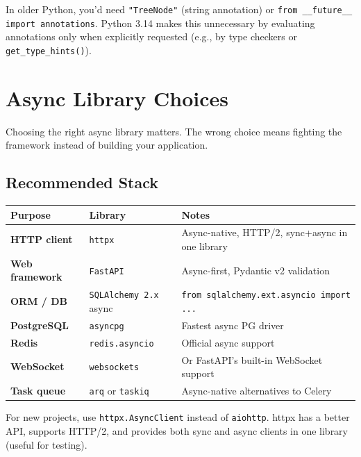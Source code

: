\documentclass[11pt,a4paper,oneside]{book}
\newcommand{\py}[1]{\texttt{\color{pyblue}#1}}
\begin{document}
\begin{infobox}
In older Python, you'd need \py{"TreeNode"} (string annotation) or
\py{from \_\_future\_\_ import annotations}. Python 3.14 makes this unnecessary by
evaluating annotations only when explicitly requested (e.g., by type checkers or
\py{get\_type\_hints()}).
\end{infobox}

\chapter{Async Library Choices}

Choosing the right async library matters. The wrong choice means fighting the framework
instead of building your application.

\section{Recommended Stack}

\begin{center}
\begin{tcolorbox}[
    colback=codebg,
    colframe=pyblue,
    width=0.95\textwidth,
    arc=3pt,
    boxrule=1pt,
]
\renewcommand{\arraystretch}{1.4}
\begin{tabularx}{\textwidth}{>{\bfseries}l l X}
\toprule
Purpose & Library & Notes \\
\midrule
HTTP client & \py{httpx} & Async-native, HTTP/2, sync+async in one library \\
Web framework & \py{FastAPI} & Async-first, Pydantic v2 validation \\
ORM / DB & \py{SQLAlchemy 2.x} async & \texttt{from sqlalchemy.ext.asyncio import ...} \\
PostgreSQL & \py{asyncpg} & Fastest async PG driver \\
Redis & \py{redis.asyncio} & Official async support \\
WebSocket & \py{websockets} & Or FastAPI's built-in WebSocket support \\
Task queue & \py{arq} or \py{taskiq} & Async-native alternatives to Celery \\
\bottomrule
\end{tabularx}
\end{tcolorbox}
\end{center}

\begin{dangerbox}[title={Do not use aiohttp}]
For new projects, use \py{httpx.AsyncClient} instead of \py{aiohttp}. httpx has a better API,
supports HTTP/2, and provides both sync and async clients in one library (useful for testing).
\end{dangerbox}
\end{document}
